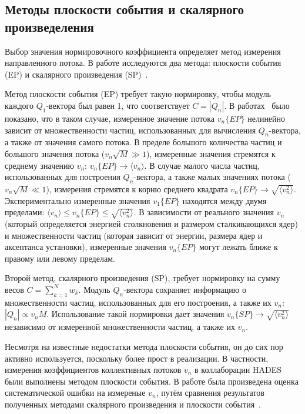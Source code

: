 \subsection{Методы плоскости события и скалярного произведеления}

Выбор значения нормировочного коэффициента определяет метод измерения направленного потока. 
В работе исследуются два метода: плоскости события (EP) и скалярного произведения (SP)~\cite{Mamaev:2020lpi}. 

Метод плоскости события (EP) требует такую нормировку, чтобы модуль каждого $Q_1$-вектора был равен 1, что соответствует $C=|Q_n|$. 
В работах~\cite{Borghini:2001vi, Bhalerao:2006tp} было показано, что в таком случае, измеренное значение потока $v_n\{EP\}$ нелинейно зависит от множественности частиц, использованных для вычисления $Q_n$-вектора, а также от значения самого потока. 
В пределе большого количества частиц и большого значения потока ($v_n \sqrt{M} \gg 1$), измеренные значения стремятся к среднему значению $v_n$: $v_n\{EP\} \xrightarrow{} \langle v_n \rangle$. 
В случае малого числа частиц, использованных для построения $Q_n$-вектора, а также малых значениях потока ($v_n \sqrt{M} \ll 1$), измерения стремятся к корню среднего квадрата $ v_n\{EP\} \xrightarrow{} \sqrt{ \langle v_n^2 \rangle }$.
Экспериментально измеренные значения $v_1\{EP\}$ находятся между двумя пределами: $ \langle v_n \rangle \leq v_n\{EP\} \leq \sqrt{ \langle v_n^2 \rangle } $.
В зависимости от реального значения $v_n$ (который определяется энергией столкновения и размером сталкивающихся ядер) и множественности частиц (которая зависит от энергии, размера ядер и аксептанса установки), измеренные значения $v_n\{EP\}$ могут лежать ближе к правому или левому пределам.

Второй метод, скалярного произведения (SP), требует нормировку на сумму весов $C=\sum_{k=1}^N w_k$.
Модуль $Q_n$-вектора сохраняет информацию о множественности частиц, использованных для его построения, а также их $v_n$: $|Q_n| \propto v_n M$.
Использование такой нормировки дает значения $v_n\{SP\} \xrightarrow{} \sqrt{\langle v_n^2 \rangle}$ независимо от измеренной множественности частиц, а также их $v_n$.

Несмотря на известные недостатки метода плоскости события, он до сих пор активно используется, поскольку более прост в реализации. 
В частности, измерения коэффициентов коллективных потоков $v_n$ в коллаборации HADES~\cite{HADES:2020lob} были выполнены методом плоскости события. 
В работе была произведена оценка систематической ошибки на измереные $v_n$, путём сравнения результатов полученных методами скалярного произведения и плоскости события~\cite{Mamaev:2020lpi}.

